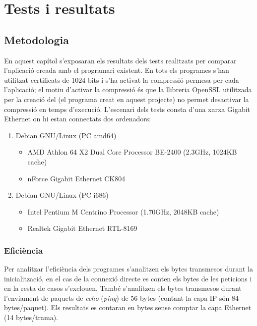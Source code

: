 \chapter{Tests i resultats}
\section{Metodologia}
En aquest capítol s'exposaran els resultats dels tests realitzats per comparar l'aplicació creada amb el programari existent.
En tots els programes s'han utilitzat certificats de 1024 bits i s'ha activat la compressió permesa per cada l'aplicació; el motiu d'activar la compressió és que la llibreria OpenSSL utilitzada per la creació del  (el programa creat en aquest projecte) no permet desactivar la compressió en temps d'execució.
L'escenari dels tests consta d'una xarxa Gigabit Ethernet on hi estan connectats dos ordenadors:
\begin{enumerate}
\item Debian GNU/Linux (PC amd64)
\begin{itemize}
\item AMD Athlon 64 X2 Dual Core Processor BE-2400 (2.3GHz, 1024KB cache)
\item nForce Gigabit Ethernet CK804
\end{itemize}
\item Debian GNU/Linux (PC i686)
\begin{itemize}
\item Intel Pentium M Centrino Processor (1.70GHz, 2048KB cache)
\item Realtek Gigabit Ethernet RTL-8169
\end{itemize}
\end{enumerate}
\subsection{Eficiència}
Per analitzar l'eficiència dels programes s'analitzen els bytes transmesos durant la inicialització, en el cas de la connexió directe es conten els bytes de les peticions  i en la resta de casos s'exclouen.
També s'analitzen els bytes transmesos durant l'enviament de paquets  de \emph{echo} (\emph{ping}) de 56 bytes (contant la capa IP són 84 bytes/paquet).
Els resultats es contaran en bytes sense comptar la capa Ethernet (14 bytes/trama).

